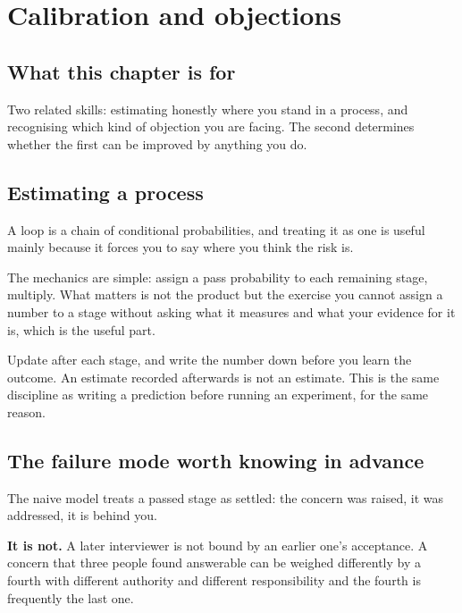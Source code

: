 \chapter{Calibration and objections}
\label{ch:calibration}

\section*{What this chapter is for}

Two related skills: estimating honestly where you stand in a process, and
recognising which kind of objection you are facing. The second determines
whether the first can be improved by anything you do.

\section{Estimating a process}

A loop is a chain of conditional probabilities, and treating it as one is
useful mainly because it forces you to say where you think the risk is.

The mechanics are simple: assign a pass probability to each remaining stage,
multiply. What matters is not the product but the exercise \dash{} you cannot
assign a number to a stage without asking what it measures and what your
evidence for it is, which is the useful part.

\begin{kitnote}
Update after each stage, and write the number down before you learn the
outcome. An estimate recorded afterwards is not an estimate. This is the same
discipline as writing a prediction before running an experiment, for the same
reason.
\end{kitnote}

\section{The failure mode worth knowing in advance}

The naive model treats a passed stage as settled: the concern was raised, it
was addressed, it is behind you.

\textbf{It is not.} A later interviewer is not bound by an earlier one's
acceptance. A concern that three people found answerable can be weighed
differently by a fourth with different authority and different responsibility
\dash{} and the fourth is frequently the last one.


